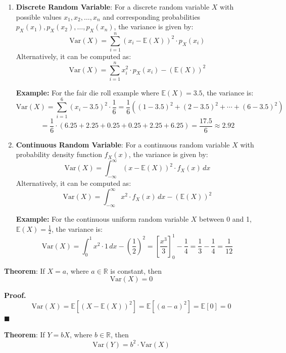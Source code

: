 \documentclass[twoside]{book}
\begin{document}
\begin{enumerate}

\item \textbf{Discrete Random Variable}: For a discrete random variable \( X \) with possible values \( x_1, x_2, \dots, x_n \) and corresponding probabilities \( p_X(x_1), p_X(x_2), \dots, p_X(x_n) \), the variance is given by:
\[
\text{Var}(X) = \sum_{i=1}^{n} (x_i - \mathbb{E}(X))^2 \cdot p_X(x_i)
\]
Alternatively, it can be computed as:
\[
\text{Var}(X) = \sum_{i=1}^{n} x_i^2 \cdot p_X(x_i) - (\mathbb{E}(X))^2
\]

\textbf{Example:} For the fair die roll example where \( \mathbb{E}(X) = 3.5 \), the variance is:
\[
\text{Var}(X) = \sum_{i=1}^{6} (x_i - 3.5)^2 \cdot \frac{1}{6} = \frac{1}{6} \left( (1-3.5)^2 + (2-3.5)^2 + \cdots + (6-3.5)^2 \right)
\]
\[
= \frac{1}{6} \cdot (6.25 + 2.25 + 0.25 + 0.25 + 2.25 + 6.25) = \frac{17.5}{6} \approx 2.92
\]

\item \textbf{Continuous Random Variable}: For a continuous random variable \( X \) with probability density function \( f_X(x) \), the variance is given by:
\[
\text{Var}(X) = \int_{-\infty}^{\infty} (x - \mathbb{E}(X))^2 \cdot f_X(x) \, dx
\]
Alternatively, it can be computed as:
\[
\text{Var}(X) = \int_{-\infty}^{\infty} x^2 \cdot f_X(x) \, dx - (\mathbb{E}(X))^2
\]

\textbf{Example:} For the continuous uniform random variable \( X \) between 0 and 1, $\mathbb{E}(X) = \frac{1}{2}$, the variance is:
\[
\text{Var}(X) = \int_0^1 x^2 \cdot 1 \, dx - \left(\frac{1}{2}\right)^2 = \left[ \frac{x^3}{3} \right]_0^1 - \frac{1}{4} = \frac{1}{3} - \frac{1}{4} = \frac{1}{12}
\]
\end{enumerate}

\begin{textbox}
\textbf{Theorem}: If \( X = a \), where \( a \in \mathbb{R} \) is constant, then
\[
\mathrm{Var}(X) = 0
\]
\end{textbox}

\textbf{Proof.}
\[
\mathrm{Var}(X) = \mathbb{E}[(X - \mathbb{E}(X))^2] = \mathbb{E}[(a - a)^2] = \mathbb{E}[0] = 0
\]
\hfill\(\blacksquare\)

\vspace{1em}

\begin{textbox}
\textbf{Theorem}: If \( Y = bX \), where \( b \in \mathbb{R} \), then
\[
\mathrm{Var}(Y) = b^2 \cdot \mathrm{Var}(X)
\]
\end{textbox}
\end{document}
